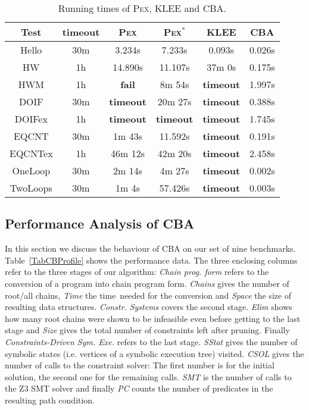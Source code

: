 \documentclass{llncs}
\newcommand{\Pex}{\textsc{Pex}\xspace}
\newcommand{\Klee}{\textsc{KLEE}\xspace}
\newcommand{\CBATool}{\textsc{CBA}\xspace}
\newcommand{\tout}{\textbf{timeout}}
\begin{document}
\begin{table}[!htb]
\vspace{-.3cm}
\centering
    \begin{tabular}{||*{6}{c|}|}
      \hline

      \bf Test  &
      \tout &
      \Pex &
      \Pex$^*$ &
      \Klee &
      \CBATool \\
      \hline
      \hline
      Hello    & 30m & 3.234s  & 7.233s  & 0.093s           & 0.026s \\
      HW       & 1h  & 14.890s & 11.107s & 37m 0s           & 0.175s \\
      HWM      & 1h  & \textbf{fail}     & 8m 54s           & \tout & 1.997s \\
      DOIF      & 30m & \tout  & 20m 27s          & \tout & 0.388s \\
      DOIFex       & 1h  & \tout  & \tout & \tout & 1.745s \\
      EQCNT    & 30m & 1m 43s  & 11.592s & \tout & 0.191s \\
      \hline
      EQCNTex  & 1h  & 46m 12s & 42m 20s & \tout & 2.458s \\
      OneLoop  & 30m & 2m 14s  & 4m 27s  & \tout & 0.002s \\
      TwoLoops & 30m & 1m 4s   & 57.426s & \tout & 0.003s \\
      \hline
    \end{tabular}

\medskip
  \caption{Running times of \Pex, \Klee and \CBATool.}
\label{TabExprRes}
\vspace{-1.2cm}
\end{table}

\subsection{Performance Analysis of \CBATool}
\label{sec:Perform}

In this section we discuss the behaviour of \CBATool on our set of nine
benchmarks. Table~\ref{TabCBProfile} shows the performance data. The three
enclosing columns refer to the three stages of our algorithm: \emph{Chain
  prog. form} refers to the conversion of a program into chain program
form. \emph{Chains} gives the number of root/all chains, \emph{Time} the
time\ needed for the conversion and \emph{Space} the size of resulting data
structures. \emph{Constr. Systems} covers the second stage.
\emph{Elim} shows how many root chains were shown to be
infeasible even before getting to the last stage and \emph{Size} gives the
total number of constraints left after pruning. Finally
\emph{Constraints-Driven Sym. Exe.} refers to the last stage.
\emph{SStat} gives the number of symbolic states (i.e. vertices of a
symbolic execution tree) visited. \emph{CSOL} gives the number of calls to
the constraint solver: The first number is for the initial solution, the
second one for the remaining calls. \emph{SMT} is the number of calls to the
Z3 SMT solver and finally \emph{PC} counts the number of predicates in the
resulting path condition. 
\end{document}
